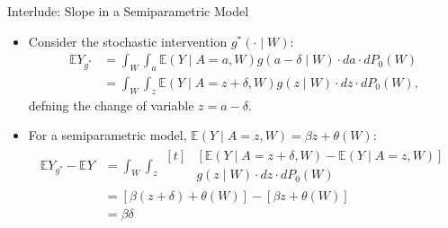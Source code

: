 \documentclass{beamer}
\newcommand{\E}{\mathbb{E}}
\begin{document}
\begin{frame}[c]{Interlude: Slope in a Semiparametric Model}

\begin{center}
\begin{itemize}
  \itemsep10pt
  \item Consider the stochastic intervention $g^*(\cdot \mid W)$:
    \begin{align*}
      \E Y_{g^*} &= \int_W \int_a \E(Y \mid A = a, W) g(a - \delta \mid W)
          \cdot da \cdot dP_0(W) \\
        &= \int_W \int_z \E(Y \mid A = z + \delta, W) g(z \mid W) \cdot dz
          \cdot dP_0(W),
    \end{align*}
      defning the change of variable $z = a - \delta$.
  \item For a semiparametric model, $\E (Y \mid A = z, W) = \beta z +
    \theta(W)$:
    \begin{align*}
      \E Y_{g^*} - \E Y &= \int_W \int_z
      \begin{aligned}[t]
        & [\E(Y \mid A = z + \delta, W) - \E(Y \mid A = z, W)] \\
        & g(z \mid W) \cdot dz \cdot dP_0(W)
      \end{aligned} \\
      &= [\beta (z + \delta) + \theta(W)] - [\beta z + \theta(W)] \\
      &= \beta \delta
    \end{align*}
\end{itemize}
\end{center}

\note{
}

\end{frame}

\end{document}

